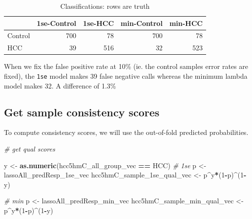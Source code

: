 \documentclass[
]{book}
\newenvironment{Shaded}{\begin{snugshade}}{\end{snugshade}}
\newcommand{\CommentTok}[1]{\textcolor[rgb]{0.56,0.35,0.01}{\textit{#1}}}
\newcommand{\DecValTok}[1]{\textcolor[rgb]{0.00,0.00,0.81}{#1}}
\newcommand{\KeywordTok}[1]{\textcolor[rgb]{0.13,0.29,0.53}{\textbf{#1}}}
\newcommand{\NormalTok}[1]{#1}
\newcommand{\OperatorTok}[1]{\textcolor[rgb]{0.81,0.36,0.00}{\textbf{#1}}}
\newcommand{\StringTok}[1]{\textcolor[rgb]{0.31,0.60,0.02}{#1}}
\begin{document}
\begin{table}

\caption{\label{tab:hcc5hmC-glmnetSuite-get-sample-class}Classifications: rows are truth}
\centering
\begin{tabular}[t]{l|r|r|r|r}
\hline
  & 1se-Control & 1se-HCC & min-Control & min-HCC\\
\hline
Control & 700 & 78 & 700 & 78\\
\hline
HCC & 39 & 516 & 32 & 523\\
\hline
\end{tabular}
\end{table}

When we fix the false positive rate at 10\% (ie. the control samples error rates are fixed),
the \texttt{1se} model makes 39 false negative calls whereas the minimum lambda model makes 32. A difference
of 1.3\%

\hypertarget{get-sample-consistency-scores}{%
\subsection*{Get sample consistency scores}\label{get-sample-consistency-scores}}

To compute consistency scores, we will use the out-of-fold predicted probabilities.

\begin{Shaded}
\begin{Highlighting}[]
\CommentTok{\# get qual scores}

\NormalTok{y <{-}}\StringTok{ }\KeywordTok{as.numeric}\NormalTok{(hcc5hmC\_all\_group\_vec }\OperatorTok{==}\StringTok{ \textquotesingle{}HCC\textquotesingle{}}\NormalTok{)}
\CommentTok{\# 1se}
\NormalTok{p <{-}}\StringTok{ }\NormalTok{lassoAll\_predResp\_1se\_vec}
\NormalTok{hcc5hmC\_sample\_1se\_qual\_vec <{-}}\StringTok{ }\NormalTok{p}\OperatorTok{\^{}}\NormalTok{y}\OperatorTok{*}\NormalTok{(}\DecValTok{1}\OperatorTok{{-}}\NormalTok{p)}\OperatorTok{\^{}}\NormalTok{(}\DecValTok{1}\OperatorTok{{-}}\NormalTok{y)}

\CommentTok{\# min}
\NormalTok{p <{-}}\StringTok{ }\NormalTok{lassoAll\_predResp\_min\_vec}
\NormalTok{hcc5hmC\_sample\_min\_qual\_vec <{-}}\StringTok{ }\NormalTok{p}\OperatorTok{\^{}}\NormalTok{y}\OperatorTok{*}\NormalTok{(}\DecValTok{1}\OperatorTok{{-}}\NormalTok{p)}\OperatorTok{\^{}}\NormalTok{(}\DecValTok{1}\OperatorTok{{-}}\NormalTok{y)}
\end{Highlighting}
\end{Shaded}
\end{document}
